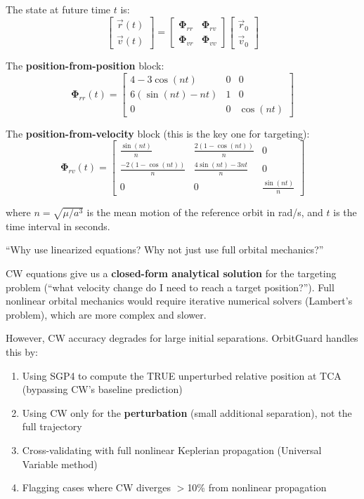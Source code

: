 \documentclass[12pt,a4paper]{article}
\begin{document}
\begin{formulabox}[title=Formula: CW State Transition Matrix]
The state at future time $t$ is:
\[
\begin{bmatrix} \vec{r}(t) \\ \vec{v}(t) \end{bmatrix} = \begin{bmatrix} \boldsymbol{\Phi}_{rr} & \boldsymbol{\Phi}_{rv} \\ \boldsymbol{\Phi}_{vr} & \boldsymbol{\Phi}_{vv} \end{bmatrix} \begin{bmatrix} \vec{r}_0 \\ \vec{v}_0 \end{bmatrix}
\]

The \textbf{position-from-position} block:
\[
\boldsymbol{\Phi}_{rr}(t) = \begin{bmatrix} 4 - 3\cos(nt) & 0 & 0 \\ 6(\sin(nt) - nt) & 1 & 0 \\ 0 & 0 & \cos(nt) \end{bmatrix}
\]

The \textbf{position-from-velocity} block (this is the key one for targeting):
\[
\boldsymbol{\Phi}_{rv}(t) = \begin{bmatrix} \frac{\sin(nt)}{n} & \frac{2(1 - \cos(nt))}{n} & 0 \\[6pt] \frac{-2(1 - \cos(nt))}{n} & \frac{4\sin(nt) - 3nt}{n} & 0 \\[6pt] 0 & 0 & \frac{\sin(nt)}{n} \end{bmatrix}
\]

where $n = \sqrt{\mu / a^3}$ is the mean motion of the reference orbit in rad/s, and $t$ is the time interval in seconds.
\end{formulabox}

\begin{questionbox}
``Why use linearized equations? Why not just use full orbital mechanics?''
\end{questionbox}
\begin{answerbox}
CW equations give us a \textbf{closed-form analytical solution} for the targeting problem (``what velocity change do I need to reach a target position?''). Full nonlinear orbital mechanics would require iterative numerical solvers (Lambert's problem), which are more complex and slower.

However, CW accuracy degrades for large initial separations. OrbitGuard handles this by:
\begin{enumerate}
    \item Using SGP4 to compute the TRUE unperturbed relative position at TCA (bypassing CW's baseline prediction)
    \item Using CW only for the \textbf{perturbation} (small additional separation), not the full trajectory
    \item Cross-validating with full nonlinear Keplerian propagation (Universal Variable method)
    \item Flagging cases where CW diverges $>$10\% from nonlinear propagation
\end{enumerate}
\end{answerbox}
\end{document}
